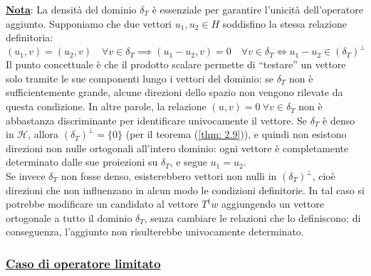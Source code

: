 \documentclass[a4paper,12pt]{report}
\begin{document}
\underline{\textbf{Nota}}: La densità del dominio $\delta_T$ è essenziale per garantire l’unicità dell’operatore aggiunto. Supponiamo che due vettori $u_1,u_2 \in H$ soddisfino la stessa relazione definitoria:
\[
(u_1, v) = (u_2, v) \quad \forall v \in \delta_T\implies 
(u_1 - u_2, v) = 0 \quad \forall v \in \delta_T
\iff u_1 - u_2 \in (\delta_T)^\perp\]
Il punto concettuale è che il prodotto scalare permette di “testare” un vettore solo tramite le sue componenti lungo i vettori del dominio: se $\delta_T$ non è sufficientemente grande, alcune direzioni dello spazio non vengono rilevate da questa condizione. In altre parole, la relazione $(u,v)=0 \ \forall v \in \delta_T$ non è abbastanza discriminante per identificare univocamente il vettore. Se $\delta_T$ è denso in $\mathscr{H}$, allora $(\delta_T)^\perp=\{0\}$ (per il teorema (\ref{thm: 2.9})), e quindi non esistono direzioni non nulle ortogonali all'intero dominio: ogni vettore è completamente determinato dalle sue proiezioni su $\delta_T$, e segue $u_1=u_2$.
\\Se invece $\delta_T$ non fosse denso, esisterebbero vettori non nulli in $(\delta_T)^\perp$, cioè direzioni che non influenzano in alcun modo le condizioni definitorie. In tal caso si potrebbe modificare un candidato al vettore $T^\dagger w$ aggiungendo un vettore ortogonale a tutto il dominio $\delta_T$, senza cambiare le relazioni che lo definiscono; di conseguenza, l’aggiunto non risulterebbe univocamente determinato.


\subsubsection{\underline{Caso di operatore limitato}}
\end{document}
